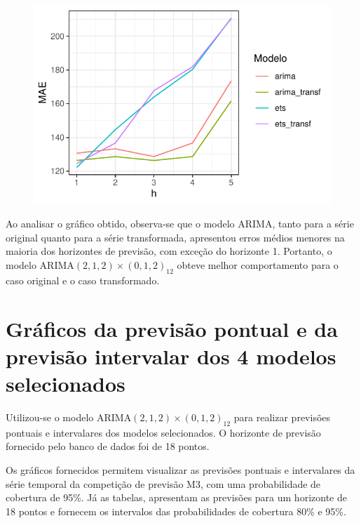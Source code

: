 \documentclass[
  letterpaper,
  DIV=11,
  numbers=noendperiod]{scrartcl}
\begin{document}
\begin{figure}

{\centering \includegraphics{T2_grupo5_files/figure-pdf/performance-1.pdf}

}

\end{figure}

Ao analisar o gráfico obtido, observa-se que o modelo ARIMA, tanto para
a série original quanto para a série transformada, apresentou erros
médios menores na maioria dos horizontes de previsão, com exceção do
horizonte 1. Portanto, o modelo
\(\text{ARIMA}(2,1,2)\times(0,1,2)_{12}\) obteve melhor comportamento
para o caso original e o caso transformado.

\hypertarget{gruxe1ficos-da-previsuxe3o-pontual-e-da-previsuxe3o-intervalar-dos-4-modelos-selecionados}{%
\section{Gráficos da previsão pontual e da previsão intervalar dos 4
modelos
selecionados}\label{gruxe1ficos-da-previsuxe3o-pontual-e-da-previsuxe3o-intervalar-dos-4-modelos-selecionados}}

Utilizou-se o modelo \(\text{ARIMA}(2,1,2)\times(0,1,2)_{12}\) para
realizar previsões pontuais e intervalares dos modelos selecionados. O
horizonte de previsão fornecido pelo banco de dados foi de 18 pontos.

Os gráficos fornecidos permitem visualizar as previsões pontuais e
intervalares da série temporal da competição de previsão M3, com uma
probabilidade de cobertura de 95\%. Já as tabelas, apresentam as
previsões para um horizonte de 18 pontos e fornecem os intervalos das
probabilidades de cobertura 80\% e 95\%.
\end{document}
